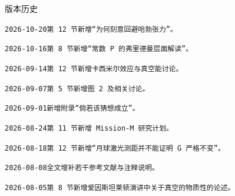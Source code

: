 \documentclass[12pt,leqno]{article}
\begin{document}
	
	\begin{footnotesize}
		\linespread{1}\selectfont
		\vspace{0.1em}
		\noindent{\color{lightgray}\rule{\linewidth}{0.3pt}}
		\vspace{0.1em}
		
		\noindent
		版本历史
		
		\vspace{0.1em}
		\texttt{2026-10-20\hspace{1.2em}第 12 节新增“为何刻意回避哈勃张力”。}
				
		\vspace{0.1em}
		\texttt{2026-10-16\hspace{1.2em}第 8 节新增“常数 $P$ 的弗里德曼层面解读”。}
		
		\vspace{0.1em}
		\texttt{2026-09-14\hspace{1.2em}第 12 节新增卡西米尔效应与真空能讨论。}
		
		\vspace{0.1em}
		\texttt{2026-09-07\hspace{1.2em}第 5 节新增图 2 及相关讨论。}
		
		\vspace{0.1em}
		\texttt{2026-09-01\hspace{1.2em}新增附录“倘若该猜想成立”。}
		
		\vspace{0.1em}
		\texttt{2026-08-24\hspace{1.2em}第 11 节新增 Mission-M 研究计划。}
		
		\vspace{0.1em}
		\texttt{2026-08-18\hspace{1.2em}第 12 节新增“月球激光测距并不能证明 $G$ 严格不变”。}

		\vspace{0.1em}
		\texttt{2026-08-08\hspace{1.2em}全文增补若干参考文献与注释说明。}
		
		\vspace{0.1em}
		\texttt{2026-08-05\hspace{1.2em}第 8 节新增爱因斯坦莱顿演讲中关于真空的物质性的论述。}
		

\end{footnotesize}
\end{document}
